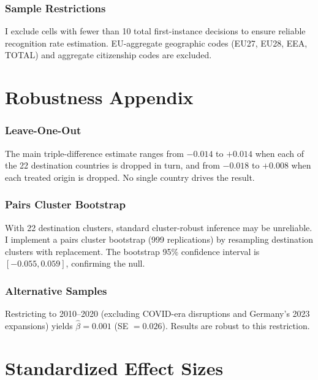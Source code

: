 \documentclass[12pt]{article}
\begin{document}
\subsubsection*{Sample Restrictions} I exclude cells with fewer than 10 total first-instance decisions to ensure reliable recognition rate estimation. EU-aggregate geographic codes (EU27, EU28, EEA, TOTAL) and aggregate citizenship codes are excluded.

\section{Robustness Appendix}

\subsubsection*{Leave-One-Out} The main triple-difference estimate ranges from $-0.014$ to $+0.014$ when each of the 22 destination countries is dropped in turn, and from $-0.018$ to $+0.008$ when each treated origin is dropped. No single country drives the result.

\subsubsection*{Pairs Cluster Bootstrap} With 22 destination clusters, standard cluster-robust inference may be unreliable. I implement a pairs cluster bootstrap (999 replications) by resampling destination clusters with replacement. The bootstrap 95\% confidence interval is $[-0.055, 0.059]$, confirming the null.

\subsubsection*{Alternative Samples} Restricting to 2010--2020 (excluding COVID-era disruptions and Germany's 2023 expansions) yields $\hat{\beta} = 0.001$ (SE $= 0.026$). Results are robust to this restriction.

\section{Standardized Effect Sizes}
\label{sec:sde}


\end{document}
